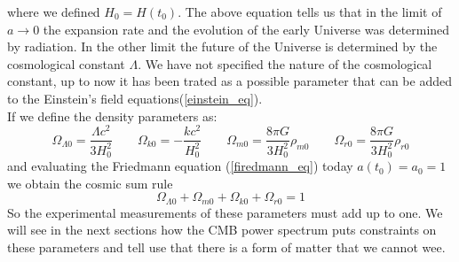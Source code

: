 \documentclass{article}
\newcommand{\beq}{\begin{equation}}
\newcommand{\eeq}{\end{equation}}
\begin{document}
where we defined $H_0 = H(t_0)$.
The above equation tells us that in the limit of $a \rightarrow 0$ the expansion rate and the evolution of the early Universe was determined by radiation.
In the other limit the future of the Universe is determined by the cosmological constant $\Lambda$.
We have not specified the nature of the cosmological constant, up to now it has been trated as a possible parameter that can be added to the Einstein's field equations(\ref{einstein_eq}).
\\
If we define the density parameters as:
\beq
\Omega_{\Lambda 0} = \dfrac{\Lambda c^2}{3 H_0 ^2} \qquad \Omega_{k0} = -  \dfrac{k c^2}{H_0 ^2} \qquad
\Omega_{m0} = \dfrac{8 \pi G}{3 H_0 ^2} \rho_{m 0} \qquad \Omega_{r0} =\dfrac{8 \pi G}{3 H_0 ^2} \rho_{r 0}
\eeq
 and evaluating the Friedmann equation (\ref{firedmann_eq}) today $a(t_0) =a_0 =1$ we obtain the cosmic sum rule
\begin{equation}
\label{cosmic_rule}
\Omega_{\Lambda 0} + \Omega_{m 0} + \Omega_{k 0} + \Omega_{r 0} = 1
\end{equation}
So the experimental measurements of these parameters must add up to one.
We will see in the next sections how the CMB power spectrum puts constraints on these parameters and tell use that there is a form of matter that we cannot wee.
\end{document}
